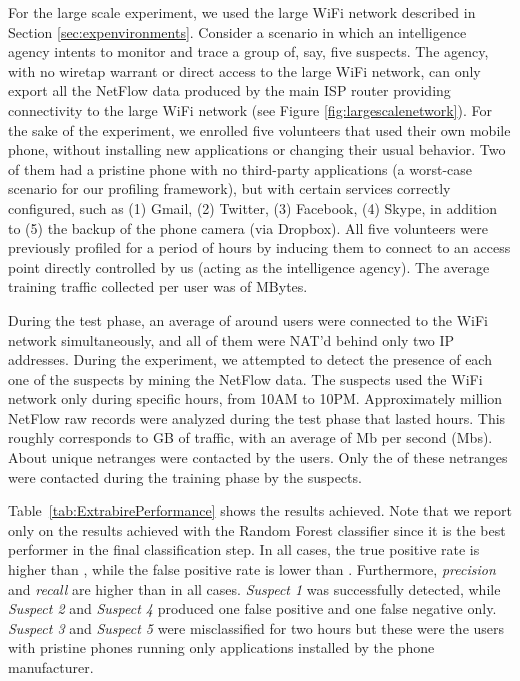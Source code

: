 \documentclass[10pt,conference,compsocconf,letterpaper]{IEEEtran}
\begin{document}
For the large scale experiment, we used the large WiFi network described in Section \ref{sec:expenvironments}. 
Consider a scenario in which an intelligence agency intents to monitor and trace 
a group of, say, five suspects. The agency, with no wiretap warrant or direct access 
to the large WiFi network, can only export all the NetFlow data produced by the main ISP router providing connectivity to the large WiFi network (see Figure \ref{fig:largescalenetwork}).
For the sake of the experiment, we enrolled five volunteers that used their own mobile phone, without installing new applications or changing their usual behavior. Two of them had a pristine phone with no third-party applications (a worst-case scenario for our profiling framework), but with certain services correctly configured, such as (1) Gmail, (2) Twitter,
(3) Facebook, (4) Skype, in addition to (5) the backup of the phone camera (via Dropbox). 
All five volunteers were previously profiled for a period of  hours by inducing them to connect to an access point directly controlled by us (acting as the intelligence agency). The average training traffic collected per user was of  MBytes.

During the test phase, an average of around  users were connected to the WiFi network simultaneously, and all of them 
were NAT'd behind only two IP addresses. During the experiment, we attempted to detect the presence of each one of the suspects by mining the NetFlow data. The suspects used the WiFi network only during specific hours, from 10AM to 10PM.
Approximately  million NetFlow raw records were analyzed during the test phase that lasted  hours. This roughly corresponds to  GB of traffic, with an average of  Mb per second (Mbs). 
About  unique netranges were contacted by the  users. Only the  of these netranges were contacted during the training phase by the suspects.


Table~\ref{tab:ExtrabirePerformance} shows the results achieved. Note that we report only on the results 
achieved with the Random Forest classifier since it is the best performer in the final classification step. 
In all cases, the true positive rate is higher than , while the false positive rate is lower than . Furthermore, {\em precision} and {\em recall} are higher than  in all cases. 
\textit{Suspect 1} was successfully detected, while \textit{Suspect 2} and \textit{Suspect 4} produced one false positive and one false negative only. 
\textit{Suspect 3} and \textit{Suspect 5} were misclassified for two hours but these were the users with pristine phones running only applications installed by the phone manufacturer.
\end{document}
